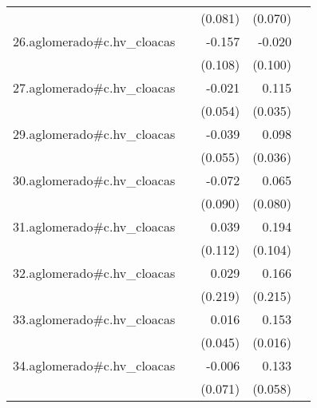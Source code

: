 {\begin{longtable}{l*{4}{D{.}{.}{-1}}}
            &                     &     (0.081)         &     (0.070)         &                     \\
\addlinespace
26.aglomerado#c.hv\_cloacas&                     &      -0.157         &      -0.020         &                     \\
            &                     &     (0.108)         &     (0.100)         &                     \\
\addlinespace
27.aglomerado#c.hv\_cloacas&                     &      -0.021         &       0.115\sym{**} &                     \\
            &                     &     (0.054)         &     (0.035)         &                     \\
\addlinespace
29.aglomerado#c.hv\_cloacas&                     &      -0.039         &       0.098\sym{**} &                     \\
            &                     &     (0.055)         &     (0.036)         &                     \\
\addlinespace
30.aglomerado#c.hv\_cloacas&                     &      -0.072         &       0.065         &                     \\
            &                     &     (0.090)         &     (0.080)         &                     \\
\addlinespace
31.aglomerado#c.hv\_cloacas&                     &       0.039         &       0.194         &                     \\
            &                     &     (0.112)         &     (0.104)         &                     \\
\addlinespace
32.aglomerado#c.hv\_cloacas&                     &       0.029         &       0.166         &                     \\
            &                     &     (0.219)         &     (0.215)         &                     \\
\addlinespace
33.aglomerado#c.hv\_cloacas&                     &       0.016         &       0.153\sym{***}&                     \\
            &                     &     (0.045)         &     (0.016)         &                     \\
\addlinespace
34.aglomerado#c.hv\_cloacas&                     &      -0.006         &       0.133\sym{*}  &                     \\
            &                     &     (0.071)         &     (0.058)         &                     \\

\end{longtable}}
